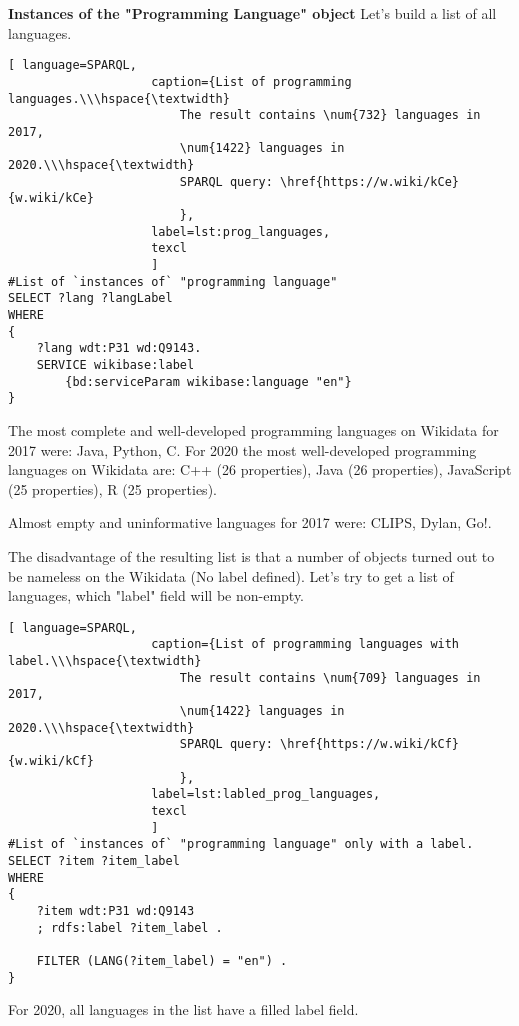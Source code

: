 \textbf{Instances of the "Programming Language" object}\newline
Let's build a list of all languages.
\begin{lstlisting}[ language=SPARQL, 
                    caption={List of programming languages.\\\hspace{\textwidth}
                        The result contains \num{732} languages in 2017, 
                        \num{1422} languages in 2020.\\\hspace{\textwidth}
                        SPARQL query: \href{https://w.wiki/kCe}{w.wiki/kCe}
                        },
                    label=lst:prog_languages,
                    texcl 
                    ]
#List of `instances of` "programming language" 
SELECT ?lang ?langLabel
WHERE
{
    ?lang wdt:P31 wd:Q9143.
    SERVICE wikibase:label 
		{bd:serviceParam wikibase:language "en"}
}
\end{lstlisting}%

The most complete and well-developed programming languages on Wikidata for 2017 were: Java, Python, C. For 2020 the most well-developed programming languages on Wikidata are: C++ (26 properties), Java (26 properties), JavaScript (25 properties), R (25 properties).

Almost empty and uninformative languages for 2017 were: CLIPS, Dylan, Go!.

The disadvantage of the resulting list is that a number of objects turned out to be nameless on the Wikidata (No label defined). Let's try to get a list of languages, which "label" field will be non-empty.

\begin{lstlisting}[ language=SPARQL, 
                    caption={List of programming languages with label.\\\hspace{\textwidth}
                        The result contains \num{709} languages in 2017, 
                        \num{1422} languages in 2020.\\\hspace{\textwidth}
                        SPARQL query: \href{https://w.wiki/kCf}{w.wiki/kCf}
                        },
                    label=lst:labled_prog_languages,
                    texcl 
                    ]
#List of `instances of` "programming language" only with a label.
SELECT ?item ?item_label
WHERE
{
    ?item wdt:P31 wd:Q9143
    ; rdfs:label ?item_label . 

    FILTER (LANG(?item_label) = "en") . 
}
\end{lstlisting}%
For 2020, all languages in the list have a filled label field.


